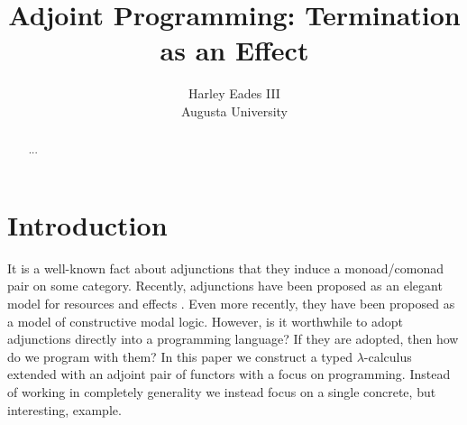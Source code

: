 \usepackage{amssymb,amsmath,amsthm}
\usepackage{stmaryrd}
\usepackage{todonotes}
\usepackage{mathpartir}
\usepackage{enumerate}
\usepackage{hyperref}
\usepackage{cmll}

\usepackage[barr]{xy}
\let\mto\to
\let\to\rightarrow

\usepackage{color}
\usepackage{supertabular}




\newcommand{\cat}[1]{\mathcal{#1}}
\newcommand{\uar}[0]{\mathop{\uparrow}}
\newcommand{\dar}[0]{\mathop{\downarrow}}
\newcommand{\st}[1]{\mathsf{st}_{#1}}
\newcommand{\case}[0]{\mathsf{case}}
\newcommand{\cur}[1]{\mathsf{cur}(#1)}
\newcommand{\app}[0]{\mathsf{app}}
\newcommand{\id}[0]{\mathsf{id}}
\newcommand{\ifrName}[1]{#1}
\newcommand{\Hom}[2]{\mathsf{Hom}_{#1}(#2)}
\let\t\relax
\newcommand{\t}[0]{\mathsf{t}}
\newcommand{\m}[1]{\mathsf{m}_{#1}}
\newcommand{\n}[1]{\mathsf{n}_{#1}}
\newcommand{\p}[1]{\mathsf{p}_{#1}}
\newcommand{\q}[1]{\mathsf{q}_{#1}}
\newcommand{\limp}[0]{\multimap}

\title{Adjoint Programming: Termination as an Effect}

\author{Harley Eades III\\
  Augusta University}



\maketitle

\begin{abstract}
  ... 
\end{abstract}

\section{Introduction}
\label{sec:introduction}

It is a well-known fact about adjunctions that they induce a
monoad/comonad pair on some category.  Recently, adjunctions have been
proposed as an elegant model for resources and effects \cite{??}.
Even more recently, they have been proposed as a model of constructive
modal logic.  However, is it worthwhile to adopt adjunctions directly
into a programming language?  If they are adopted, then how do we
program with them?  In this paper we construct a typed
$\lambda$-calculus extended with an adjoint pair of functors with a
focus on programming.  Instead of working in completely generality we
instead focus on a single concrete, but interesting, example.

